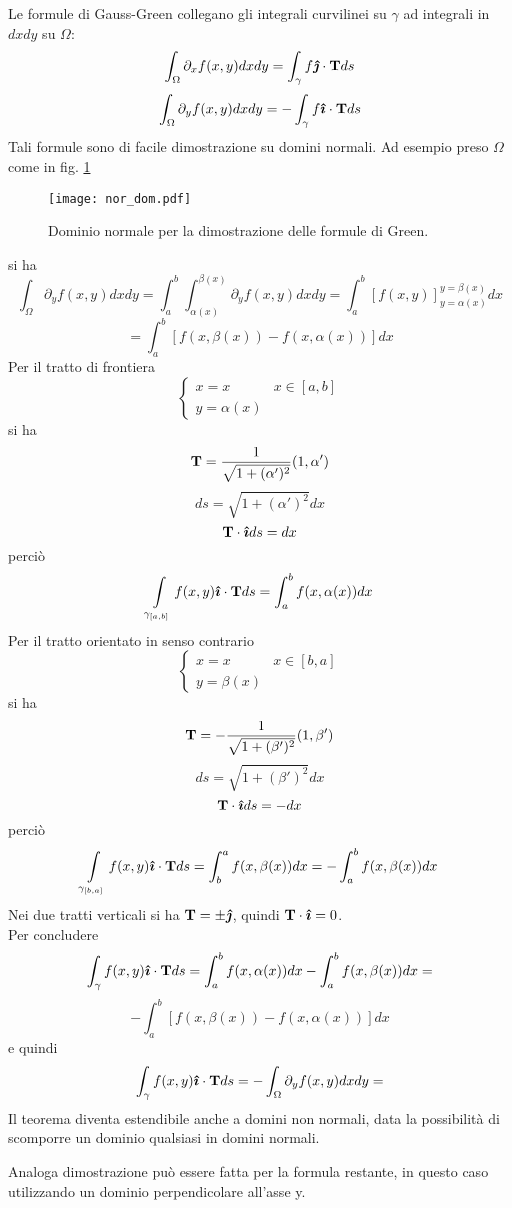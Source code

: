 Le formule di Gauss-Green collegano gli integrali curvilinei su $\gamma$
ad integrali in $dx dy$ su $\Omega$:
\[
	\int_{\Omega}\partial_x f(x,y)dx dy= \int_{\gamma} f \boldsymbol{\hat{\jmath}} \cdot {\bf T}
ds
\]
\[
	\int_{\Omega}\partial_y f(x,y)dx dy= - \int_{\gamma} f \boldsymbol{\hat{\imath}} \cdot {\bf
T} ds
\]
Tali formule sono di facile dimostrazione su domini normali. Ad esempio
preso $\Omega$ come in fig. \ref{nor_dom}
\begin{figure}[H]
	\centering
	\texttt{[image: nor\_dom.pdf]}
	\caption{Dominio normale per la dimostrazione delle formule di Green.}
	\label{nor_dom}
\end{figure}
\noindent
si ha
\[
	\int_{\Omega} \partial_y f (x,y) dx dy=
	\int_a^b \int_{\alpha(x)}^{\beta(x)}
	\partial_y f (x,y) dx dy=
	\int_a^b \left[
		f(x,y)
	\right]_{y=\alpha(x)}^{y=\beta(x)}dx
\]
\[
	= \int_a^b \left[
	f(x,\beta (x)) - f(x, \alpha(x))
	\right] dx
\]
Per il tratto di frontiera
\[
	\left\{
	\begin{array}{ll}
		x=x & x \in [a,b] \\
		y= \alpha(x)
	\end{array}
	\right.
\]
si ha
\[
	{\bf T}= \frac{1}{\sqrt{1+ (\alpha ' )^2}}(1,\alpha ')
\]
\[
	ds= \sqrt{1+ (\alpha ' )^2} dx
\]
\[
	{\bf T} \cdot \boldsymbol{\hat{\imath}} ds= dx
\]
perci\`o
\[
	\int \limits_{\gamma_{[a,b]}} f(x,y)\boldsymbol{\hat{\imath}} \cdot {\bf T} ds
	= \int_a^b f(x, \alpha(x)) dx
\]
Per il tratto orientato in senso contrario
\[
	\left\{
	\begin{array}{ll}
		x=x & x \in [b,a] \\
		y= \beta(x)
	\end{array}
	\right.
\]
si ha
\[
	{\bf T}= - \frac{1}{\sqrt{1+ (\beta ' )^2}}(1,\beta ')
\]
\[
	ds= \sqrt{1+ (\beta ' )^2} dx
\]
\[
	{\bf T} \cdot \boldsymbol{\hat{\imath}} ds= -dx
\]
perci\`o
\[
	\int \limits_{\gamma_{[b,a]}} f(x,y)\boldsymbol{\hat{\imath}} \cdot {\bf T} ds
	= \int_b^a f(x, \beta(x)) dx
	= -\int_a^b f(x, \beta(x)) dx
\]
Nei due tratti verticali si ha ${\bf T} = \pm \boldsymbol{\hat{\jmath}}$,
quindi ${\bf T} \cdot \boldsymbol{\hat{\imath}} = 0$.\\
Per concludere
\[
	\int_{\gamma} f(x,y)\boldsymbol{\hat{\imath}} \cdot {\bf T} ds =
	\int_a^b f(x, \alpha(x)) dx
	- \int_a^b f(x, \beta(x)) dx=
\]
\[
	- \int_a^b \left[ f(x, \beta(x)) -f(x, \alpha(x)) \right] dx
\]
e quindi
\[
	\int_{\gamma} f(x,y)\boldsymbol{\hat{\imath}} \cdot {\bf T} ds =
	- \int_{\Omega} \partial_y f (x,y) dx dy=
\]
Il teorema diventa estendibile anche a domini non normali, data la possibilit\`a
di scomporre un dominio qualsiasi in domini normali.

Analoga dimostrazione pu\`o essere fatta per la formula restante, in questo
caso utilizzando un dominio perpendicolare all'asse y.

